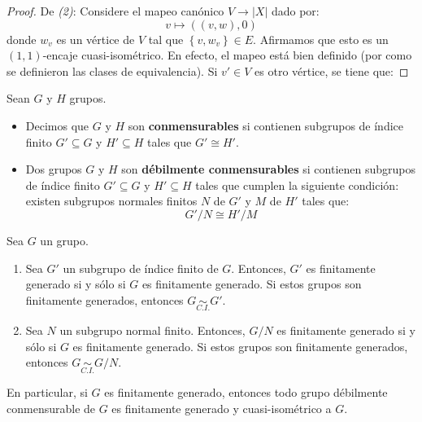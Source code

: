 \documentclass[12pt]{report}
\newcounter{it}
\theoremstyle{largebreak}
\newcommand\abs[1]{\ensuremath{\left|#1\right|}}
\newcommand{\qisom}{\ensuremath{\underset{C.I.}{\sim}}}
\begin{document}
    \begin{proof}
        De \textit{(2)}: Considere el mapeo canónico $V\rightarrow\abs{X}$ dado por:
        \begin{equation*}
            v\mapsto ((v,w),0)
        \end{equation*}
        donde $w_v$ es un vértice de $V$ tal que $\left\{v,w_v \right\}\in E$. Afirmamos que esto es un $(1,1)$-encaje cuasi-isométrico. En efecto, el mapeo está bien definido (por como se definieron las clases de equivalencia). Si $v'\in V$ es otro vértice, se tiene que: 
    \end{proof}

    \begin{mydef}
        Sean $G$ y $H$ grupos.
        \begin{itemize}
            \item Decimos que $G$ y $H$ son \textbf{conmensurables} si contienen subgrupos de índice finito $G'\subseteq G$ y $H'\subseteq H$ tales que $G'\cong H'$.
            \item Dos grupos $G$ y $H$ son \textbf{débilmente conmensurables} si contienen subgrupos de índice finito $G'\subseteq G$ y $H'\subseteq H$ tales que cumplen la siguiente condición: existen subgrupos normales finitos $N$ de $G'$ y $M$ de $H'$ tales que:
            \begin{equation*}
                G'/N\cong H'/M
            \end{equation*}
        \end{itemize}
    \end{mydef}

    \begin{excer}
        Sea $G$ un grupo.
        \begin{enumerate}[label = \textit{(\arabic*)}]
            \item Sea $G'$ un subgrupo de índice finito de $G$. Entonces, $G'$ es finitamente generado si y sólo si $G$ es finitamente generado. Si estos grupos son finitamente generados, entonces $G\qisom G'$.
            \item Sea $N$ un subgrupo normal finito. Entonces, $G/N$ es finitamente generado si y sólo si $G$ es finitamente generado. Si estos grupos son finitamente generados, entonces $G\qisom G/N$.
        \end{enumerate}
        En particular, si $G$ es finitamente generado, entonces todo grupo débilmente conmensurable de $G$ es finitamente generado y cuasi-isométrico a $G$.
    \end{excer}
\end{document}
